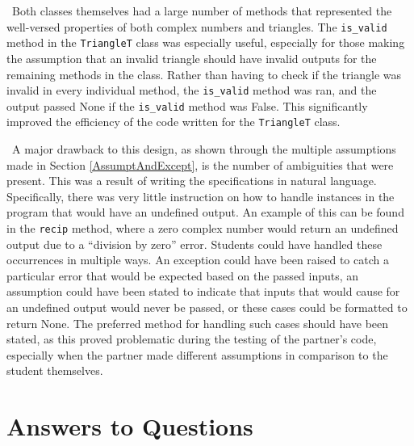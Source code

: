 \documentclass[12pt]{article}
\begin{document}
\newpage 

~\newline\noindent Both classes themselves had a large number of methods that represented the well-versed properties of both complex numbers and triangles. The \verb |is_valid| method in the \verb |TriangleT| class was especially useful, especially for those making the assumption that an invalid triangle should have invalid outputs for the remaining methods in the class. Rather than having to check if the triangle was invalid in every individual method, the \verb |is_valid| method was ran, and the output passed None if the \verb |is_valid| method was False. This significantly improved the efficiency of the code written for the \verb |TriangleT| class. 

~\newline\noindent A major drawback to this design, as shown through the multiple assumptions made in Section \ref{AssumptAndExcept}, is the number of ambiguities that were present. This was a result of writing the specifications in natural language. Specifically, there was very little instruction on how to handle instances in the program that would have an undefined output. An example of this can be found in the \verb |recip| method, where a zero complex number would return an undefined output due to a “division by zero” error. Students could have handled these occurrences in multiple ways. An exception could have been raised to catch a particular error that would be expected based on the passed inputs, an assumption could have been stated to indicate that inputs that would cause for an undefined output would never be passed, or these cases could be formatted to return None. The preferred method for handling such cases should have been stated, as this proved problematic during the testing of the partner’s code, especially when the partner made different assumptions in comparison to the student themselves.

\section{Answers to Questions}
\end{document}
